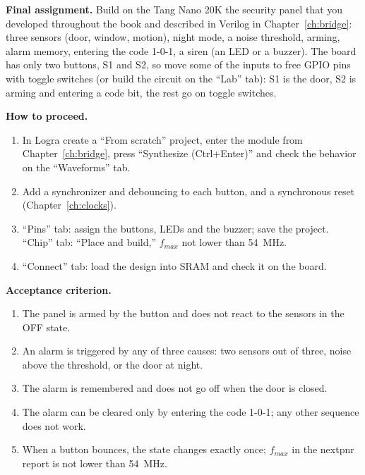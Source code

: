\begin{taskbox}
\textbf{Final assignment.} Build on the Tang Nano 20K the security panel that you developed throughout the book and described in Verilog in Chapter~\ref{ch:bridge}: three sensors (door, window, motion), night mode, a noise threshold, arming, alarm memory, entering the code 1-0-1, a siren (an LED or a buzzer). The board has only two buttons, S1 and S2, so move some of the inputs to free GPIO pins with toggle switches (or build the circuit on the ``Lab'' tab): S1 is the door, S2 is arming and entering a code bit, the rest go on toggle switches.

\textbf{How to proceed.}
\begin{enumerate}
  \item In Logra create a ``From scratch'' project, enter the  module from Chapter~\ref{ch:bridge}, press ``Synthesize (Ctrl+Enter)'' and check the behavior on the ``Waveforms'' tab.
  \item Add a synchronizer and debouncing to each button, and a synchronous reset (Chapter~\ref{ch:clocks}).
  \item ``Pins'' tab: assign the buttons, LEDs and the buzzer; save the project. ``Chip'' tab: ``Place and build,'' $f_{max}$ not lower than 54~MHz.
  \item ``Connect'' tab: load the design into SRAM and check it on the board.
\end{enumerate}

\textbf{Acceptance criterion.}
\begin{enumerate}
  \item The panel is armed by the button and does not react to the sensors in the OFF state.
  \item An alarm is triggered by any of three causes: two sensors out of three, noise above the threshold, or the door at night.
  \item The alarm is remembered and does not go off when the door is closed.
  \item The alarm can be cleared only by entering the code 1-0-1; any other sequence does not work.
  \item When a button bounces, the state changes exactly once; $f_{max}$ in the nextpnr report is not lower than 54~MHz.
\end{enumerate}
\end{taskbox}
